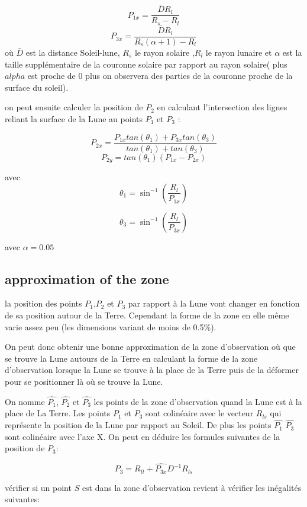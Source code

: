 \documentclass{article} %
\begin{document}
		$$	
		P_{1x}=\frac{\bar{D}R_l}{R_s-R_l}
		$$ 
		$$	
		P_{3x}=\frac{\bar{D}R_l}{R_s(\alpha+1)-R_l}
		$$ 
		où $\bar{D}$ est la distance Soleil-lune, $R_s$ le rayon solaire ,$R_l$ le rayon lunaire et $\alpha$ est la taille supplémentaire de la couronne solaire par rapport au rayon solaire( plus $alpha$ est proche de 0 plus on observera des parties de la couronne proche de la surface du soleil).
		
		on peut ensuite calculer la position de $P_2$ en calculant l'intersection des lignes reliant la surface de la Lune au points $P_1$ et $P_3$ : 
		
		$$
		P_{2x}=\frac{P_{1x}tan(\theta_1) + P_{3x}tan(\theta_3)}{tan(\theta_1) + tan(\theta_3)}
		$$
		$$
		P_{2y}=tan(\theta_1)(P_{1x}-P_{2x})
		$$
		
		avec
		$$
		\theta_1=\sin^{-1}\left(\frac{R_l}{P_{1x}}\right)
		$$
		
		$$
		\theta_3=\sin^{-1}\left(\frac{R_l}{P_{3x}}\right)
		$$
		
		avec $\alpha=0.05$
		
		\subsection{approximation of the zone}
		la position des points $P_1$,$P_2$ et $P_3$ par rapport à la Lune vont changer en fonction de sa position autour de la Terre. Cependant la forme de la zone en elle même varie assez peu (les dimensions variant de moins de 0.5\%).
		
		On peut donc obtenir une bonne approximation de la zone d'observation où que se trouve la Lune autours de la Terre en calculant la forme de la zone d'observation lorsque la Lune se trouve à la place de la Terre puis de la déformer pour se positionner là où se trouve la Lune.
		
		On nomme $\hat{P_1}$, $\hat{P_2}$ et $\hat{P_3}$ les points de la zone d'observation quand la Lune est à la place de La Terre. Les points $P_1$ et $P_3$ sont colinéaire avec le vecteur $R_{ls}$ qui représente la position de la Lune par rapport au Soleil.
		De plus les points $\hat{P_1}$ $\hat{P_3}$ sont colinéaire avec l'axe X. On peut en déduire les formules suivantes de la position de $P_3$:
		
		$$
		\begin{equation}
			P_3=R_{lt}+\hat{P_{3x}}D^{-1}R_{ls} 
		\end{equation}
		$$
		
		vérifier si un point $S$ est dans la zone d'observation revient à vérifier les inégalités suivantes:
		
\end{document}
